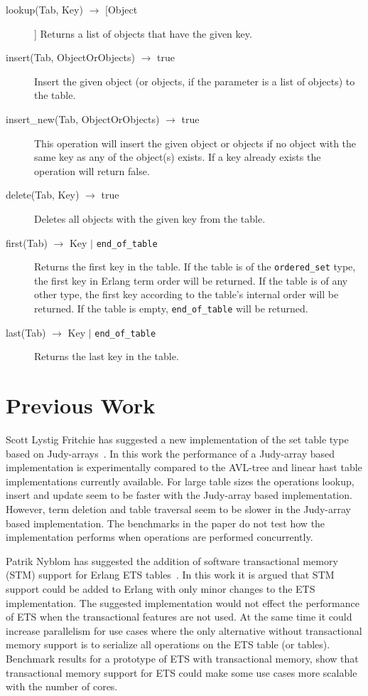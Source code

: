 \documentclass[aps,pre,preprint,nofootinbib]{revtex4}
\begin{document}
\begin{description}
 \item[lookup(Tab, Key) $\rightarrow$ [Object]] 
 Returns a list of objects that have the given key. 
 \item[insert(Tab, ObjectOrObjects) $\rightarrow$ true]
 Insert the given object (or objects, if the parameter is a list of objects) to the table.
 \item[insert\_new(Tab, ObjectOrObjects) $\rightarrow$ true]
 This operation will insert the given object or objects if no object with the same key as any of the object(s) exists. 
 If a key already exists the operation will return false.
 \item[delete(Tab, Key) $\rightarrow$ true] Deletes all objects with the given key from the table.
 \item[first(Tab) $\rightarrow$ Key $|$ \texttt{end\_of\_table} ] Returns the first key in the table. If the table is of the \verb|ordered_set| type, the first key in Erlang term order will be returned. If the table is of any other type, the first key according to the table's internal order will be returned. If the table is empty, \verb|end_of_table| will be returned.
 \item[last(Tab) $\rightarrow$ Key $|$ \texttt{end\_of\_table} ] Returns the last key in the table.
\end{description}

\section{Previous Work}

  Scott Lystig Fritchie has suggested a new implementation of the set table type based on Judy-arrays~\cite{ScottEtsJudy}.
  In this work the performance of a Judy-array based implementation is experimentally compared to the AVL-tree and linear hast table implementations currently available.
  For large table sizes the operations lookup, insert and update seem to be faster with the Judy-array based implementation.
  However, term deletion and table traversal seem to be slower in the Judy-array based implementation.
  The benchmarks in the paper do not test how the implementation performs when operations are performed concurrently.
  
  Patrik Nyblom has suggested the addition of software transactional memory (STM) support for Erlang ETS tables~\cite{PatrikErlangTrans}.
  In this work it is argued that STM support could be added to Erlang with only minor changes to the ETS implementation.
  The suggested implementation would not effect the performance of ETS when the transactional features are not used.
  At the same time it could increase parallelism for use cases where the only alternative without transactional memory support is to serialize all operations on the ETS table (or tables).
  Benchmark results for a prototype of ETS with transactional memory, show that transactional memory support for ETS could make some use cases more scalable with the number of cores.
  
\end{document}
